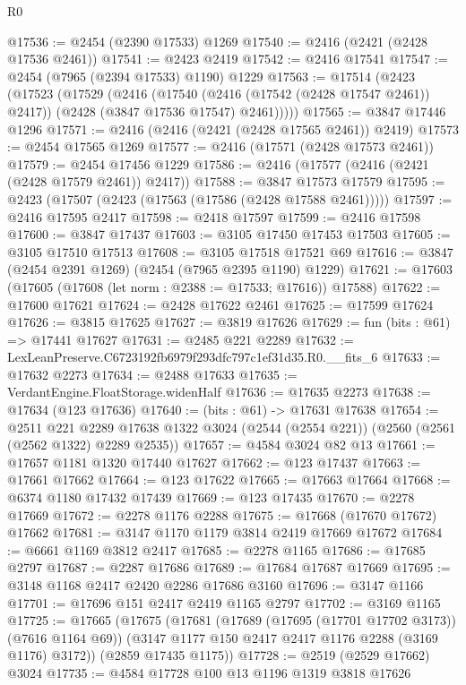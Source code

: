 \begin{lexlean}{R0}
\begin{coremodule}
@17536 := @2454 (@2390 @17533) @1269
@17540 := @2416 (@2421 (@2428 @17536 @2461))
@17541 := @2423 @2419
@17542 := @2416 @17541
@17547 := @2454 (@7965 (@2394 @17533) @1190) @1229
@17563 := @17514
    (@2423
      (@17523
        (@17529
          (@2416
            (@17540 (@2416 (@17542 (@2428 @17547 @2461)) @2417))
            (@2428 (@3847 @17536 @17547) @2461)))))
@17565 := @3847 @17446 @1296
@17571 := @2416 (@2416 (@2421 (@2428 @17565 @2461)) @2419)
@17573 := @2454 @17565 @1269
@17577 := @2416 (@17571 (@2428 @17573 @2461))
@17579 := @2454 @17456 @1229
@17586 := @2416 (@17577 (@2416 (@2421 (@2428 @17579 @2461)) @2417))
@17588 := @3847 @17573 @17579
@17595 := @2423 (@17507 (@2423 (@17563 (@17586 (@2428 @17588 @2461)))))
@17597 := @2416 @17595 @2417
@17598 := @2418 @17597
@17599 := @2416 @17598
@17600 := @3847 @17437
@17603 := @3105 @17450 @17453 @17503
@17605 := @3105 @17510 @17513
@17608 := @3105 @17518 @17521 @69
@17616 := @3847 (@2454 @2391 @1269) (@2454 (@7965 @2395 @1190) @1229)
@17621 := @17603 (@17605 (@17608 (let norm : @2388 := @17533; @17616)) @17588)
@17622 := @17600 @17621
@17624 := @2428 @17622 @2461
@17625 := @17599 @17624
@17626 := @3815 @17625
@17627 := @3819 @17626
@17629 := fun (bits : @61) => @17441 @17627
@17631 := @2485 @221 @2289
@17632 := LexLeanPreserve.C6723192fb6979f293dfc797c1ef31d35.R0.__fits_6
@17633 := @17632 @2273
@17634 := @2488 @17633
@17635 := VerdantEngine.FloatStorage.widenHalf
@17636 := @17635 @2273
@17638 := @17634 (@123 @17636)
@17640 := (bits : @61) -> @17631 @17638
@17654 := @2511
    @221
    @2289
    @17638
    @1322
    @3024
    (@2544 (@2554 @221))
    (@2560 (@2561 (@2562 @1322) @2289 @2535))
@17657 := @4584 @3024 @82 @13
@17661 := @17657 @1181 @1320 @17440 @17627
@17662 := @123 @17437
@17663 := @17661 @17662
@17664 := @123 @17622
@17665 := @17663 @17664
@17668 := @6374 @1180 @17432 @17439
@17669 := @123 @17435
@17670 := @2278 @17669
@17672 := @2278 @1176 @2288
@17675 := @17668 (@17670 @17672) @17662
@17681 := @3147 @1170 @1179 @3814 @2419 @17669 @17672
@17684 := @6661 @1169 @3812 @2417
@17685 := @2278 @1165
@17686 := @17685 @2797
@17687 := @2287 @17686
@17689 := @17684 @17687 @17669
@17695 := @3148 @1168 @2417 @2420 @2286 @17686 @3160
@17696 := @3147 @1166
@17701 := @17696 @151 @2417 @2419 @1165 @2797
@17702 := @3169 @1165
@17725 := @17665
    (@17675
      (@17681
        (@17689 (@17695 (@17701 @17702 @3173)) (@7616 @1164 @69))
        (@3147 @1177 @150 @2417 @2417 @1176 @2288 (@3169 @1176) @3172))
      (@2859 @17435 @1175))
@17728 := @2519 (@2529 @17662) @3024
@17735 := @4584 @17728 @100 @13 @1196 @1319 @3818 @17626

\end{coremodule}
\end{lexlean}
